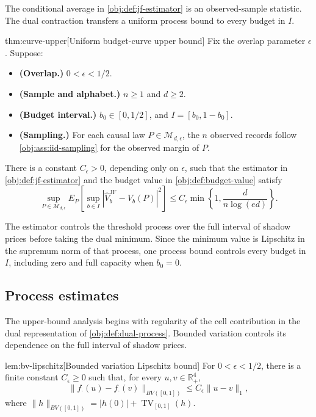 \documentclass[11pt]{article}
\begin{document}
The conditional average in \cref{obj:def:jf-estimator} is an observed-sample statistic. The dual contraction transfers a uniform process bound to every budget in \(I\).

\begin{theoremv}{thm:curve-upper}[Uniform budget-curve upper bound]
Fix the overlap parameter \(\epsilon\). Suppose:
\begin{itemize}
\item \textbf{(Overlap.)} \(0<\epsilon<1/2\).
\item \textbf{(Sample and alphabet.)} \(n\geq 1\) and \(d\geq 2\).
\item \textbf{(Budget interval.)} \(b_0\in[0,1/2]\), and \(I=[b_0,1-b_0]\).
\item \textbf{(Sampling.)} For each causal law \(P\in\mathcal M_{d,\epsilon}\), the \(n\) observed records follow \cref{obj:ass:iid-sampling} for the observed margin of \(P\).
\end{itemize}
There is a constant \(C_\epsilon>0\), depending only on \(\epsilon\), such that the estimator in \cref{obj:def:jf-estimator} and the budget value in \cref{obj:def:budget-value} satisfy
\[
\sup_{P\in\mathcal M_{d,\epsilon}}
E_P\!\left[
\sup_{b\in I}
\left|\widehat V_b^{\mathrm{JF}}-V_b(P)\right|^2
\right]
\leq
C_\epsilon\min\left\{1,\frac{d}{n\log(ed)}\right\}.
\]
\end{theoremv}

The estimator controls the threshold process over the full interval of shadow prices before taking the dual minimum. Since the minimum value is Lipschitz in the supremum norm of that process, one process bound controls every budget in \(I\), including zero and full capacity when \(b_0=0\).

\subsection{Process estimates}

The upper-bound analysis begins with regularity of the cell contribution in the dual representation of \cref{obj:def:dual-process}. Bounded variation controls its dependence on the full interval of shadow prices.

\begin{lemmav}{lem:bv-lipschitz}[Bounded variation Lipschitz bound]
For \(0<\epsilon<1/2\), there is a finite constant \(C_\epsilon\ge 0\) such that, for every \(u,v\in\mathbb R_+^4\),
\[
\|f_{\cdot}(u)-f_{\cdot}(v)\|_{BV([0,1])}
\le C_\epsilon\|u-v\|_1,
\]
where \(\|h\|_{BV([0,1])}=|h(0)|+\operatorname{TV}_{[0,1]}(h)\).
\end{lemmav}
\end{document}
